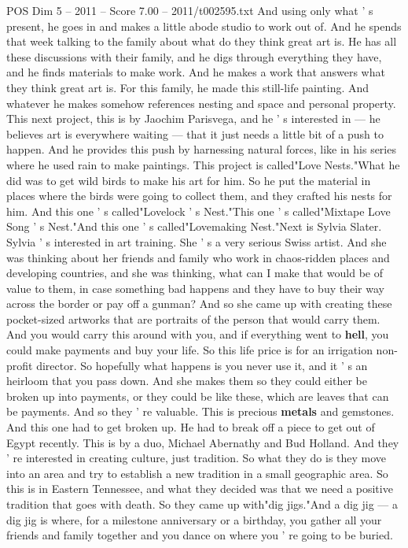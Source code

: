 \begin{textsample}{POS Dim 5 – 2011 – Score 7.00 – 2011/t002595.txt}
And using only what ' s present, he goes in and makes a little abode studio to work out of.
And he spends that week talking to the family about what do they think great art is.
He has all these discussions with their family, and he digs through everything they have, and he finds materials to make work.
And he makes a work that answers what they think great art is.
For this family, he made this still-life painting.
And whatever he makes somehow references nesting and space and personal property.
This next project, this is by Jaochim Parisvega, and he ' s interested in — he believes art is everywhere waiting — that it just needs a little bit of a push to happen.
And he provides this push by harnessing natural forces, like in his series where he used rain to make paintings.
This project is called"Love Nests."What he did was to get wild birds to make his art for him.
So he put the material in places where the birds were going to collect them, and they crafted his nests for him.
And this one ' s called"Lovelock ' s Nest."This one ' s called"Mixtape Love Song ' s Nest."And this one ' s called"Lovemaking Nest."Next is Sylvia Slater.
Sylvia ' s interested in art training.
She ' s a very serious Swiss artist.
And she was thinking about her friends and family who work in chaos-ridden places and developing countries, and she was thinking, what can I make that would be of value to them, in case something bad happens and they have to buy their way across the border or pay off a gunman?
And so she came up with creating these pocket-sized artworks that are portraits of the person that would carry them.
And you would carry this around with you, and if everything went to \textbf{hell}, you could make payments and buy your life.
So this life price is for an irrigation non-profit director.
So hopefully what happens is you never use it, and it ' s an heirloom that you pass down.
And she makes them so they could either be broken up into payments, or they could be like these, which are leaves that can be payments.
And so they ' re valuable.
This is precious \textbf{metals} and gemstones.
And this one had to get broken up.
He had to break off a piece to get out of Egypt recently.
This is by a duo, Michael Abernathy and Bud Holland.
And they ' re interested in creating culture, just tradition.
So what they do is they move into an area and try to establish a new tradition in a small geographic area.
So this is in Eastern Tennessee, and what they decided was that we need a positive tradition that goes with death.
So they came up with"dig jigs."And a dig jig — a dig jig is where, for a milestone anniversary or a birthday, you gather all your friends and family together and you dance on where you ' re going to be buried.

\end{textsample}
